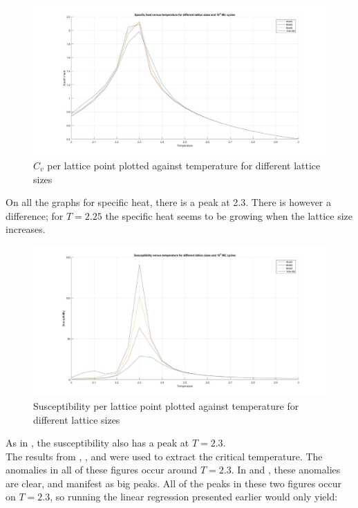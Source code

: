 \documentclass[10pt,a4paper]{article}
\begin{document}
\begin{figure} [H]
\centerline{
\includegraphics[scale=0.26]{heatVSt.jpg}
}
\caption{$C_v$ per lattice point plotted against temperature for different lattice sizes}
\label{fig:HeatVSt}
\end{figure}

\noindent On all the graphs for specific heat, there is a peak at 2.3. There is however a difference; for $T=2.25$ the specific heat seems to be growing when the lattice size increases.

\begin{figure} [H]
\centerline{
\includegraphics[scale=0.26]{susceptibilityVSt.jpg}
}
\caption{Susceptibility per lattice point plotted against temperature for different lattice sizes}
\label{fig:SusVSt}
\end{figure}

\noindent As in , the susceptibility also has a peak at $T=2.3$.\\


\noindent The results from , ,  and  were used to extract the critical temperature. The anomalies in all of these figures occur around $T=2.3$. In  and , these anomalies are clear, and manifest as big peaks. All of the peaks in these two figures occur on $T=2.3$, so running the linear regression presented earlier would only yield:
\end{document}
